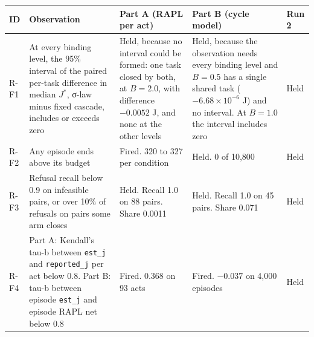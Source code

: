 \documentclass[
  10pt,
]{article}
\newcounter{none} %
\begin{document}
{\def\LTcaptype{none} %
\begin{longtable}[]{@{}
  >{\raggedright\arraybackslash}p{}
  >{\raggedright\arraybackslash}p{}
  >{\raggedright\arraybackslash}p{}
  >{\raggedright\arraybackslash}p{}
  >{\raggedright\arraybackslash}p{}@{}}
\toprule\noalign{}
\begin{minipage}[b]{\linewidth}\raggedright
ID
\end{minipage} & \begin{minipage}[b]{\linewidth}\raggedright
Observation
\end{minipage} & \begin{minipage}[b]{\linewidth}\raggedright
Part A (RAPL per act)
\end{minipage} & \begin{minipage}[b]{\linewidth}\raggedright
Part B (cycle model)
\end{minipage} & \begin{minipage}[b]{\linewidth}\raggedright
Run 2
\end{minipage} \\
\midrule\noalign{}
\endhead
\bottomrule\noalign{}
\endlastfoot
R-F1 & At every binding level, the 95\% interval of the paired per-task
difference in median \(J^*\), σ-law minus fixed cascade, includes or
exceeds zero & Held, because no interval could be formed: one task
closed by both, at \(B = 2.0\), with difference \(-0.0052\) J, and none
at the other levels & Held, because the observation needs every binding
level and \(B = 0.5\) has a single shared task (\(-6.68 \times 10^{-6}\)
J) and no interval. At \(B = 1.0\) the interval includes zero & Held \\
R-F2 & Any episode ends above its budget & Fired. 320 to 327 per
condition & Held. 0 of 10,800 & Held \\
R-F3 & Refusal recall below 0.9 on infeasible pairs, or over 10\% of
refusals on pairs some arm closes & Held. Recall 1.0 on 88 pairs. Share
0.0011 & Held. Recall 1.0 on 45 pairs. Share 0.071 & Held \\
R-F4 & Part A: Kendall's tau-b between \texttt{est\_j} and
\texttt{reported\_j} per act below 0.8. Part B: tau-b between episode
\texttt{est\_j} and episode RAPL net below 0.8 & Fired. 0.368 on 93 acts
& Fired. \(-0.037\) on 4,000 episodes & Held \\

\end{longtable}}
\end{document}
